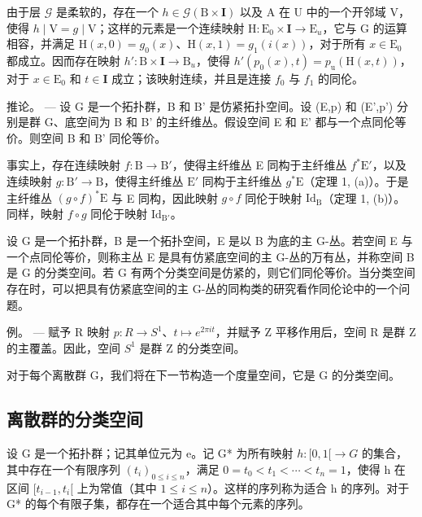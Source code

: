 由于层 \(\mathcal{G}\) 是柔软的，存在一个 \(h \in \mathcal{G}(\mathrm{B} \times \mathbf{I})\) 以及 A 在 U 中的一个开邻域 V，使得 \(h \mid \mathrm{V} = g \mid \mathrm{V}\)；这样的元素是一个连续映射 \(\mathrm{H} \colon \mathrm{E}_0 \times \mathbf{I} \to \mathrm{E}_{u}\)，它与 G 的运算相容，并满足 \(\mathrm{H}(x,0) = g_0(x)\)、\(\mathrm{H}(x,1) = g_1(i(x))\)，对于所有 \(x \in \mathrm{E}_0\) 都成立。因而存在映射 \(h' \colon \mathrm{B} \times \mathbf{I} \to \mathrm{B}_{u}\)，使得 \(h'(p_0(x),t) = p_{\mathrm{u}}(\mathrm{H}(x,t))\)，对于 \(x \in \mathrm{E}_0\) 和 \(t \in \mathbf{I}\) 成立；该映射连续，并且是连接 \(f_0\) 与 \(f_1\) 的同伦。

推论。 --- 设 G 是一个拓扑群，B 和 B' 是仿紧拓扑空间。设 (E,p) 和 (E',p') 分别是群 G、底空间为 B 和 B' 的主纤维丛。假设空间 E 和 E' 都与一个点同伦等价。则空间 B 和 B' 同伦等价。

事实上，存在连续映射 \(f \colon \mathrm{B} \to \mathrm{B}'\)，使得主纤维丛 E 同构于主纤维丛 \(f^* \mathrm{E}'\)，以及连续映射 \(g \colon \mathrm{B}' \to \mathrm{B}\)，使得主纤维丛 \(\mathrm{E}'\) 同构于主纤维丛 \(g^* \mathrm{E}\)（定理 1, (a)）。于是主纤维丛 \((g \circ f)^* \mathrm{E}\) 与 E 同构，因此映射 \(g \circ f\) 同伦于映射 \(\mathrm{Id}_{\mathrm{B}}\)（定理 1, (b)）。同样，映射 \(f \circ g\) 同伦于映射 \(\mathrm{Id}_{\mathrm{B}'}\)。

设 G 是一个拓扑群，B 是一个拓扑空间，E 是以 B 为底的主 G-丛。若空间 E 与一个点同伦等价，则称主丛 E 是具有仿紧底空间的主 G-丛的万有丛，并称空间 B 是 G 的分类空间。若 G 有两个分类空间是仿紧的，则它们同伦等价。当分类空间存在时，可以把具有仿紧底空间的主 G-丛的同构类的研究看作同伦论中的一个问题。

例。 --- 赋予 R 映射 \(p: R \to S^{1}\)、\(t \mapsto e^{2\pi it}\)，并赋予 Z 平移作用后，空间 R 是群 Z 的主覆盖。因此，空间 \(S^{1}\) 是群 Z 的分类空间。

对于每个离散群 G，我们将在下一节构造一个度量空间，它是 G 的分类空间。

\subsection{离散群的分类空间}

设 G 是一个拓扑群；记其单位元为 e。记 G* 为所有映射 \(h\colon[0,1[ \to G\) 的集合，其中存在一个有限序列 \((t_{i})_{0\leqslant i\leqslant n}\)，满足 \(0=t_{0}<t_{1}<\cdots<t_{n}=1\)，使得 h 在区间 \([t_{i-1},t_{i}[\) 上为常值（其中 \(1\leqslant i\leqslant n\)）。这样的序列称为适合 h 的序列。对于 G* 的每个有限子集，都存在一个适合其中每个元素的序列。

